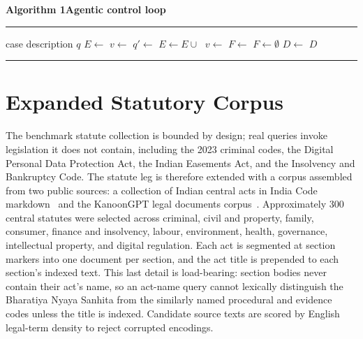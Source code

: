\documentclass{mnnit}
\begin{document}
\begin{center}
\begin{minipage}{5.1in}
\noindent\textbf{Algorithm 1\quad Agentic control loop}\\[1mm]
\hrule\vspace{1.5mm}
\begin{algorithmic}[1]
\Require case description $q$
\State $E \gets$  
\State $v \gets$  
    \State $q' \gets$  
    \State $E \gets E \cup\; $ 
    \State $v \gets$ 
\EndIf
{}
    \State $F \gets$  
\Else
    \State $F \gets \emptyset$
\EndIf
\State $D \gets$ 
\State {} 
\State \Return $D$
\end{algorithmic}
\vspace{1mm}
\hrule
\end{minipage}
\end{center}

\section{Expanded Statutory Corpus}
The benchmark statute collection is bounded by design; real
queries invoke legislation it does not contain, including the
2023 criminal codes, the Digital Personal Data Protection Act,
the Indian Easements Act, and the Insolvency and Bankruptcy Code.
The statute leg is therefore extended with a corpus assembled
from two public sources: a collection of Indian central acts in
India Code markdown~\cite{indianlegalacts} and the KanoonGPT
legal documents corpus~\cite{kanoongpt}. Approximately 300
central statutes were selected across criminal, civil and
property, family, consumer, finance and insolvency, labour,
environment, health, governance, intellectual property, and
digital regulation. Each act is segmented at section markers into
one document per section, and the act title is prepended to each
section's indexed text. This last detail is load-bearing: section
bodies never contain their act's name, so an act-name query
cannot lexically distinguish the Bharatiya Nyaya Sanhita from the
similarly named procedural and evidence codes unless the title is
indexed. Candidate source texts are scored by English legal-term
density to reject corrupted encodings.
\end{document}
